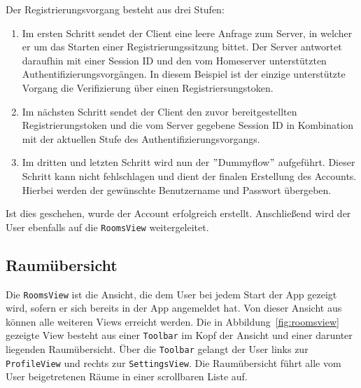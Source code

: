     Der Registrierungsvorgang besteht aus drei Stufen:
    \begin{enumerate}[label={(\arabic*)}]
        \item Im ersten Schritt sendet der Client eine leere Anfrage zum Server, in welcher er um das Starten einer Registrierungssitzung bittet.
    Der Server antwortet daraufhin mit einer Session ID und den vom Homeserver unterstützten Authentifizierungsvorgängen.
    In diesem Beispiel ist der einzige unterstützte Vorgang die Verifizierung über einen Registriersungstoken.
        \item Im nächsten Schritt sendet der Client den zuvor bereitgestellten Registrierungstoken und die vom Server gegebene Session ID in Kombination mit der aktuellen Stufe des Authentifizierungsvorgangs.
        \item Im dritten und letzten Schritt wird nun der \("\)Dummyflow\("\) aufgeführt.
    Dieser Schritt kann nicht fehlschlagen und dient der finalen Erstellung des Accounts.
    Hierbei werden der gewünschte Benutzername und Passwort übergeben.
    \end{enumerate}

    Ist dies geschehen, wurde der Account erfolgreich erstellt.
    Anschließend wird der User ebenfalls auf die \texttt{RoomsView} weitergeleitet.

    \newpage
    \subsection{Raumübersicht}\label{subsec:raumubersicht}

    Die \texttt{RoomsView} ist die Ansicht, die dem User bei jedem Start der App gezeigt wird, sofern er sich bereits in der App angemeldet hat.
    Von dieser Ansicht aus können alle weiteren Views erreicht werden.
    Die in Abbildung~\ref{fig:roomsview} gezeigte View besteht aus einer \texttt{Toolbar} im Kopf der Ansicht und einer darunter liegenden Raumübersicht.
    Über die \texttt{Toolbar} gelangt der User links zur \texttt{ProfileView} und rechts zur \texttt{SettingsView}.
    Die Raumübersicht führt alle vom User beigetretenen Räume in einer scrollbaren Liste auf.

